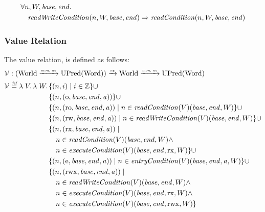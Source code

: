 \documentclass{article}
\newcommand{\monnefun}{\xrightarrow{\textit{\tiny{mon, ne}}}}
\newcommand{\nefun}{\xrightarrow{\textit{\tiny{ne}}}}
\newcommand{\defeq}{\stackrel{\textit{\tiny{def}}}{=}}
\newcommand{\union}{\mathbin{\cup}}
\newcommand{\var}[1]{\mathit{#1}}
\newcommand{\gl}{\var{g}}
\newcommand{\addr}{\var{a}}
\newcommand{\start}{\var{base}}
\newcommand{\addrend}{\var{end}}
\newcommand{\perm}{\var{perm}}
\newcommand{\stdcap}[1][(\perm,\gl)]{\left(#1,\start,\addrend,\addr \right)}
\newcommand{\plainfun}[2]{
  \ifthenelse{\equal{#2}{}}
             {\mathit{#1}}
             {\mathit{#1}(#2)}
}
\newcommand{\readCond}[1]{\plainfun{readCondition}{#1}}
\newcommand{\writeCond}[1]{\plainfun{readWriteCondition}{#1}}
\newcommand{\execCond}[1]{\plainfun{executeCondition}{#1}}
\newcommand{\entryCond}[1]{\plainfun{entryCondition}{#1}}
\newcommand{\asmType}{\plaindom{AsmType}}
\newcommand{\plaindom}[1]{\mathrm{#1}}
\newcommand{\Words}{\plaindom{Word}}
\newcommand{\ints}{\mathbb{Z}}
\newcommand{\Worlds}{\plaindom{World}}
\newcommand{\UPred}[1]{\plaindom{UPred}(#1)}
\newcommand{\intr}[2]{\mathcal{#1}}
\newcommand{\valueintr}[1]{\intr{V}{#1}}
\newcommand{\stdvr}{\valueintr{\asmType}}
\newcommand{\npair}[2][n]{\left(#1,#2 \right)}
\newcommand{\plainperm}[1]{\mathrm{#1}}
\newcommand{\noperm}{\plainperm{o}}
\newcommand{\readonly}{\plainperm{ro}}
\newcommand{\readwrite}{\plainperm{rw}}
\newcommand{\exec}{\plainperm{rx}}
\newcommand{\entry}{\plainperm{e}}
\newcommand{\rwx}{\plainperm{rwx}}
\begin{document}
\begin{lemma}
\label{lem:wc-implies-rc}
  \begin{align*}
    &\forall n, W, \start, \addrend \ldotp\\ 
    &\quad \writeCond{n,W,\start,\addrend} \Rightarrow \readCond{n,W,\start,\addrend}
  \end{align*}
\end{lemma}


\subsubsection{Value Relation}
\label{subsubsec:value-relation}
The value relation, is defined as follows:
\begin{align*}
  \stdvr & :  (\Worlds \monnefun \UPred{\Words}) \nefun \Worlds \monnefun \UPred{\Words} \\
  \stdvr &\defeq \lambda \; V \ldotp \lambda \; W \ldotp 
              \begin{aligned}[t]
  & \{ \npair{i} \mid i \in \ints \} 
    \union \\
         & \{ \npair{\stdcap[\noperm] }  \} 
           \union \\
         & \{ \npair{\stdcap[\readonly] } \mid n \in \readCond{}(V)(\start,\addrend,W) \} \union \\
         & \{ \npair{\stdcap[\readwrite] } \mid n \in \writeCond{}(V)(\start,\addrend,W) \} \union \\
         & \{ \npair{\stdcap[\exec]} \mid \\
         & \quad n \in \readCond{}(V)(\start,\addrend,W) \land \\
         & \quad n \in \execCond{}(V)(\start,\addrend,\exec,W) \}
           \union \\
         & \{ \npair{\stdcap[\entry]} \mid n \in \entryCond{}(V)(\start,\addrend,\addr,W) \} \union \\
         & \{ \npair{\stdcap[\rwx]} \mid \\
         & \quad n \in \writeCond{}(V)(\start,\addrend,W) \land \\
         & \quad n \in \execCond{}(V)(\start,\addrend,\exec,W) \land \\
         & \quad n \in \execCond{}(V)(\start,\addrend,\rwx,W) \}
       \end{aligned}
\end{align*}
\end{document}
